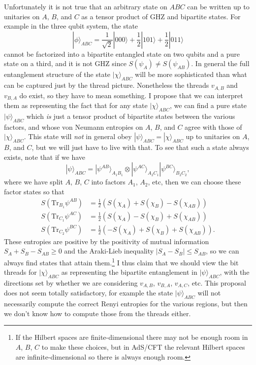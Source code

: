 \documentclass[12pt]{article}
\newcommand{\be}{\begin{equation}}
\newcommand{\ee}{\end{equation}}
\newcommand{\ran}{\rangle}
\newcommand{\Tr}{\mathrm{Tr}}
\begin{document}
Unfortunately it is not true that an arbitrary state on $ABC$ can be written up to unitaries on $A$, $B$, and $C$ as a tensor product of GHZ and bipartite states.  For example in the three qubit system, the state 
\be
|\phi\ran_{ABC}=\frac{1}{\sqrt{2}}|000\ran+\frac{1}{2}|101\ran+\frac{1}{2}|011\ran
\ee
cannot be factorized into a bipartite entangled state on two qubits and a pure state on a third, and it is not GHZ since $S(\psi_A)\neq S(\psi_{AB})$.  In general the full entanglement structure of the state $|\chi\ran_{ABC}$ will be more sophisticated than what can be captured just by the thread picture.  Nonetheless the threads $v_{A,B}$ and $v_{B,A}$ do exist, so they have to mean something.  I propose that we can interpret them as representing the fact that for any state $|\chi\ran_{ABC}$, we can find a pure state $|\psi\ran_{ABC}$ which \textit{is} just a tensor product of bipartite states between the various factors, and whose von Neumann entropies on $A$, $B$, and $C$ agree with those of $|\chi\ran_{ABC}$.  This state will \textit{not} in general obey $|\psi\ran_{ABC}=|\chi\ran_{ABC}$ up to unitaries on $A$, $B$, and $C$, but we will just have to live with that.  To see that such a state always exists, note that if we have
\be
|\psi\ran_{ABC}=|\psi^{AB}\ran_{A_1B_1}\otimes |\psi^{AC}\ran_{A_2 C_1}|\psi^{BC}\ran_{B_2 C_2},
\ee
where we have split $A$, $B$, $C$ into factors $A_1$, $A_2$, etc, then we can choose these factor states so that
\begin{align}
S(\Tr_{B_1}\psi^{AB})&=\frac{1}{2}\left(S(\chi_{A})+S(\chi_{B})-S(\chi_{AB})\right)\\
S(\Tr_{C_1}\psi^{AC})&=\frac{1}{2}\left(S(\chi_{A})-S(\chi_{B})+S(\chi_{AB})\right)\\
S(\Tr_{C_2}\psi^{BC})&=\frac{1}{2}\left(-S(\chi_{A})+S(\chi_{B})+S(\chi_{AB})\right).
\end{align}
These entropies are positive by the positivity of mutual information $S_A+S_B-S_{AB}\geq 0$ and the Araki-Lieb inequality $|S_A-S_B|\leq S_{AB}$, so we can always find states that attain them.\footnote{If the Hilbert spaces are finite-dimensional there may not be enough room in $A$, $B$, $C$ to make these choices, but in AdS/CFT the relevant Hilbert spaces are infinite-dimensional so there is always enough room.}  I thus claim that we should view the bit threads for $|\chi\ran_{ABC}$ as representing the bipartite entanglement in $|\psi\ran_{ABC}$, with the directions set by whether we are considering $v_{A,B}$, $v_{B,A}$, $v_{A,C}$, etc.  This proposal does not seem totally satisfactory, for example the state $|\psi\ran_{ABC}$ will not necessarily compute the correct Renyi entropies for the various regions, but then we don't know how to compute those from the threads either.
\end{document}
